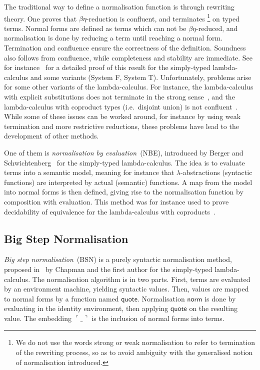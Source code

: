 \documentclass[a4paper,UKenglish,cleveref]{lipics-v2019}
\newcommand{\agdaSymb}[1]{\mathsf{#1}}
\newcommand{\q}{\agdaSymb{quote}}
\newcommand{\norm}{\agdaSymb{norm}}
\newcommand{\cul}{\ulcorner}
\newcommand{\cur}{\urcorner}
\begin{document}
The traditional way to define a normalisation function is through rewriting
theory. One proves that $\beta\eta$-reduction is confluent, and terminates%
\footnote{%
  We do not use the words strong or weak normalisation to refer to termination
  of the rewriting process, so as to avoid ambiguity with the generalised notion
  of normalisation introduced.
}
on typed terms. Normal forms are defined as terms which can not be
$\beta\eta$-reduced, and normalisation is done by reducing a term until reaching
a normal form. Termination and confluence ensure the correctness
of the definition. Soundness also follows from confluence, while completeness
and stability are immediate. See for instance~\cite{girard1989proofs} for a
detailed proof of this result for the simply-typed lambda-calculus and some
variants (System F, System T). Unfortunately, problems arise for some other
variants of the lambda-calculus. For instance, the lambda-calculus with explicit
substitutions does not terminate in the strong sense~\cite{mellies1995explicit},
and the lambda-calculus with coproduct types (i.e.\ disjoint union) is not
confluent~\cite{dougherty1995coproducts}. While some of these issues can be worked
around, for instance by using weak termination and more restrictive reductions,
these problems have lead to the development of other methods.

One of them is \emph{normalisation by evaluation}~(NBE), introduced
by Berger and Schwichtenberg~\cite{berger1991inverse} for the simply-typed
lambda-calculus. The idea is to evaluate terms into a semantic model,
meaning for instance that $\lambda$-abstractions (syntactic functions) are interpreted
by actual (semantic) functions. A map from the model into normal forms is then
defined, giving rise to the normalisation function by composition with evaluation.
This method was for instance used to prove decidability of equivalence for the
lambda-calculus with coproducts~\cite{altenkirch2001normalization}.

\subsection{Big Step Normalisation}
\emph{Big step normalisation}~(BSN) is a purely syntactic normalisation
method, proposed in~\cite{chapman2009bsn} by Chapman and the first author for
the simply-typed lambda-calculus.  The normalisation algorithm is in two
parts. First, terms are evaluated by an environment machine, yielding
syntactic values. Then, values are mapped to normal forms by a function named
$\q$. Normalisation $\norm$ is done by evaluating in the identity environment,
then applying $\q$ on the resulting value.  The embedding $\cul\_\cur$ is the
inclusion of normal forms into terms.
\end{document}
